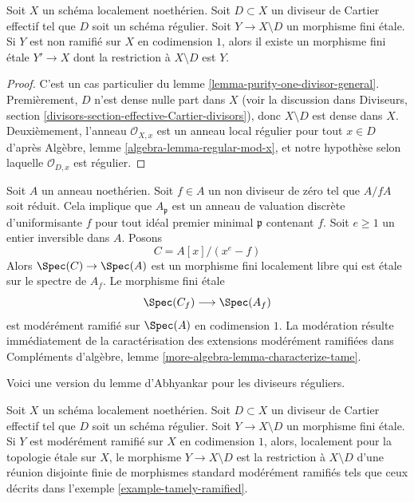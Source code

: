 \begin{lemma}
\label{lemma-purity-one-divisor}
Soit $X$ un schéma localement noethérien. Soit $D \subset X$
un diviseur de Cartier effectif tel que $D$ soit un schéma régulier.
Soit $Y \to X \setminus D$ un morphisme fini \'etale.
Si $Y$ est non ramifié sur $X$ en codimension $1$, alors
il existe un morphisme fini \'etale $Y' \to X$
dont la restriction à $X \setminus D$ est $Y$.
\end{lemma}

\begin{proof}
C'est un cas particulier du lemme \ref{lemma-purity-one-divisor-general}.
Premièrement, $D$ n'est dense nulle part dans $X$ (voir la discussion dans
Diviseurs, section \ref{divisors-section-effective-Cartier-divisors}),
donc $X \setminus D$ est dense dans $X$. Deuxièmement, l'anneau
$\mathcal{O}_{X, x}$ est un anneau local régulier pour tout $x \in D$ d'après
Algèbre, lemme \ref{algebra-lemma-regular-mod-x},
et notre hypothèse selon laquelle $\mathcal{O}_{D, x}$ est régulier.
\end{proof}

\begin{example}
\label{example-tamely-ramified}
Soit $A$ un anneau noethérien. Soit $f \in A$ un non diviseur de zéro
tel que $A/fA$ soit réduit. Cela implique que $A_\mathfrak p$
est un anneau de valuation discrète d'uniformisante $f$ pour tout
idéal premier minimal $\mathfrak p$ contenant $f$. Soit $e \geq 1$ un entier
inversible dans $A$. Posons
$$
C = A[x]/(x^e - f)
$$
Alors $\Spec(C) \to \Spec(A)$ est un morphisme fini localement libre
qui est \'etale sur le spectre de $A_f$. Le morphisme fini \'etale
$$
\Spec(C_f) \longrightarrow \Spec(A_f)
$$
est modérément ramifié sur $\Spec(A)$ en codimension $1$. La
modération résulte immédiatement de la caractérisation des extensions
modérément ramifiées dans
Compléments d'algèbre, lemme \ref{more-algebra-lemma-characterize-tame}.
\end{example}

\noindent
Voici une version du lemme d'Abhyankar pour les diviseurs réguliers.

\begin{lemma}
\label{lemma-abhyankar-one-divisor}
Soit $X$ un schéma localement noethérien. Soit $D \subset X$
un diviseur de Cartier effectif tel que $D$ soit un schéma régulier.
Soit $Y \to X \setminus D$ un morphisme fini \'etale.
Si $Y$ est modérément ramifié sur $X$ en codimension $1$, alors,
localement pour la topologie \'etale sur $X$, le morphisme $Y \to X \setminus D$ est la restriction
à $X \setminus D$ d'une réunion disjointe finie de morphismes standard modérément ramifiés
tels que ceux décrits dans l'exemple \ref{example-tamely-ramified}.
\end{lemma}

